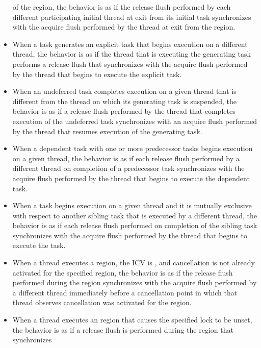 \begin{itemize}
      of the  region, the behavior is as if the release flush
      performed by each different participating initial thread at exit from
      its initial task synchronizes with the acquire flush performed by the
      thread at exit from the  region.
\item When a task generates an explicit task that begins execution on a
      different thread, the behavior is as if the thread that is executing
      the generating task performs a release flush that synchronizes with
      the acquire flush performed by the thread that begins to execute the
      explicit task.
\item When an undeferred task completes execution on a given thread that is
      different from the thread on which its generating task is suspended, the
      behavior is as if a release flush performed by the thread that
      completes execution of the undeferred task synchronizes with an acquire
      flush performed by the thread that resumes execution of the generating
      task.
\item When a dependent task with one or more predecessor tasks begins
      execution on a given thread, the behavior is as if each release flush
      performed by a different thread on completion of a predecessor task
      synchronizes with the acquire flush performed by the thread that
      begins to execute the dependent task.
\item When a task begins execution on a given thread and it is mutually
      exclusive with respect to another sibling task that is executed by a
      different thread, the behavior is as if each release flush performed
      on completion of the sibling task synchronizes with the acquire flush
      performed by the thread that begins to execute the task.
\item When a thread executes a  region, the 
      ICV is , and cancellation is not already activated for the
      specified region, the behavior is as if the release flush performed
      during the  region synchronizes with the acquire flush
      performed by a different thread immediately before a cancellation
      point in which that thread observes cancellation was activated for the region.
\item When a thread executes an  region that causes the
      specified lock to be unset, the behavior is as if a release flush is
      performed during the  region that synchronizes

\end{itemize}
